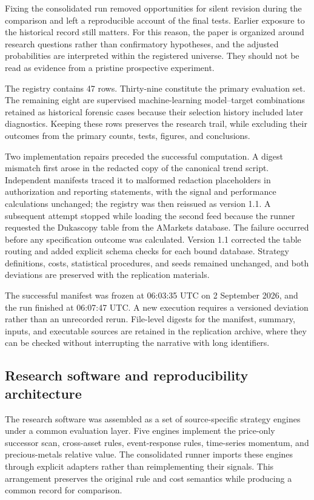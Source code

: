 Fixing the consolidated run removed opportunities for silent revision during the comparison and left a reproducible account of the final tests. Earlier exposure to the historical record still matters. For this reason, the paper is organized around research questions rather than confirmatory hypotheses, and the adjusted probabilities are interpreted within the registered universe. They should not be read as evidence from a pristine prospective experiment.

The registry contains 47 rows. Thirty-nine constitute the primary evaluation set. The remaining eight are supervised machine-learning model--target combinations retained as historical forensic cases because their selection history included later diagnostics. Keeping these rows preserves the research trail, while excluding their outcomes from the primary counts, tests, figures, and conclusions.

Two implementation repairs preceded the successful computation. A digest mismatch first arose in the redacted copy of the canonical trend script. Independent manifests traced it to malformed redaction placeholders in authorization and reporting statements, with the signal and performance calculations unchanged; the registry was then reissued as version 1.1. A subsequent attempt stopped while loading the second feed because the runner requested the Dukascopy table from the AMarkets database. The failure occurred before any specification outcome was calculated. Version 1.1 corrected the table routing and added explicit schema checks for each bound database. Strategy definitions, costs, statistical procedures, and seeds remained unchanged, and both deviations are preserved with the replication materials.

The successful manifest was frozen at 06:03:35 UTC on 2 September 2026, and the run finished at 06:07:47 UTC. A new execution requires a versioned deviation rather than an unrecorded rerun. File-level digests for the manifest, summary, inputs, and executable sources are retained in the replication archive, where they can be checked without interrupting the narrative with long identifiers.

\subsection{Research software and reproducibility architecture}\label{subsec:software}

The research software was assembled as a set of source-specific strategy engines under a common evaluation layer. Five engines implement the price-only successor scan, cross-asset rules, event-response rules, time-series momentum, and precious-metals relative value. The consolidated runner imports these engines through explicit adapters rather than reimplementing their signals. This arrangement preserves the original rule and cost semantics while producing a common record for comparison.

